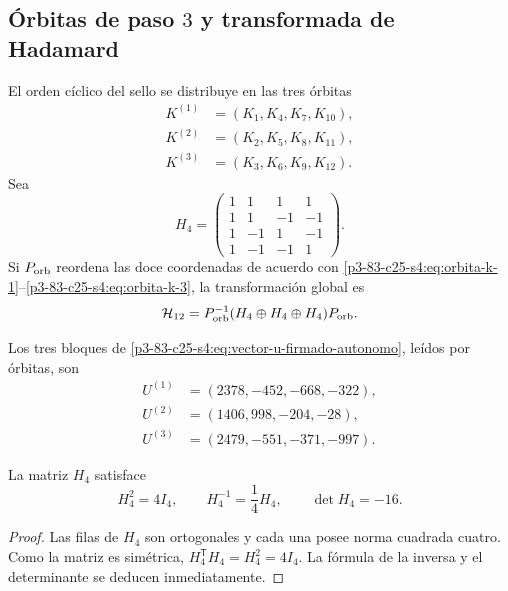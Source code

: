 \subsection{Órbitas de paso \(3\) y transformada de Hadamard}

El orden cíclico del sello se distribuye en las tres órbitas
\begin{align}
 K^{(1)}&=(K_1,K_4,K_7,K_{10}),
 \label{p3-83-c25-s4:eq:orbita-k-1}\\
 K^{(2)}&=(K_2,K_5,K_8,K_{11}),
 \label{p3-83-c25-s4:eq:orbita-k-2}\\
 K^{(3)}&=(K_3,K_6,K_9,K_{12}).
 \label{p3-83-c25-s4:eq:orbita-k-3}
\end{align}
Sea
\begin{equation}
 H_4=
 \begin{pmatrix}
 1&1&1&1\\
 1&1&-1&-1\\
 1&-1&1&-1\\
 1&-1&-1&1
 \end{pmatrix}.
 \label{p3-83-c25-s4:eq:matriz-hadamard-cuatro-autonoma}
\end{equation}
Si \(P_{\rm orb}\) reordena las doce coordenadas de acuerdo con
\eqref{p3-83-c25-s4:eq:orbita-k-1}--\eqref{p3-83-c25-s4:eq:orbita-k-3}, la transformación global es
\begin{equation}
 \mathcal H_{12}
 =P_{\rm orb}^{-1}
 (H_4\oplus H_4\oplus H_4)P_{\rm orb}.
 \label{p3-83-c25-s4:eq:hadamard-global-doce}
\end{equation}

Los tres bloques de \eqref{p3-83-c25-s4:eq:vector-u-firmado-autonomo}, leídos por
órbitas, son
\begin{align*}
 U^{(1)}&=(2378,-452,-668,-322),\\
 U^{(2)}&=(1406,998,-204,-28),\\
 U^{(3)}&=(2479,-551,-371,-997).
\end{align*}

\begin{lemma}
\label{p3-83-c25-s4:lem:cuarto-inversa-hadamard}
La matriz \(H_4\) satisface
\begin{equation}
 H_4^2=4I_4,
 \qquad
 H_4^{-1}=\frac14H_4,
 \qquad
 \det H_4=-16.
 \label{p3-83-c25-s4:eq:identidades-hadamard-cuatro}
\end{equation}
\end{lemma}

\begin{proof}
Las filas de \(H_4\) son ortogonales y cada una posee norma cuadrada cuatro.
Como la matriz es simétrica, \(H_4^{\mathsf T}H_4=H_4^2=4I_4\). La
fórmula de la inversa y el determinante se deducen inmediatamente.
\end{proof}

